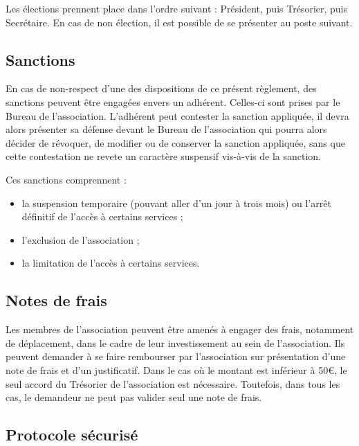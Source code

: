 \documentclass[12pt, a4paper]{article}
\begin{document}
	\bigskip

	Les élections prennent place dans l'ordre suivant : Président, puis Trésorier,
	puis Secrétaire. En cas de non élection, il est possible de se présenter au
	poste suivant.

	\subsection{Sanctions}

	En cas de non-respect d'une des dispositions de ce présent règlement, des
	sanctions peuvent être engagées envers un adhérent. Celles-ci sont prises par le
	Bureau de l'association. L'adhérent peut contester la sanction appliquée, il devra
	alors présenter sa défense devant le Bureau de l'association qui pourra alors décider
	de révoquer, de modifier ou de conserver la sanction appliquée, sans que cette
	contestation ne revete un caractère suspensif vis-à-vis de la sanction.

	\bigskip

	Ces sanctions comprennent :

	\bigskip

	\begin{itemize}
		\item[\textbullet] la suspension temporaire (pouvant aller d'un jour à trois
			mois) ou l'arrêt définitif de l'accès à certains services ;

		\item[\textbullet] l'exclusion de l'association ;

		\item[\textbullet] la limitation de l'accès à certains services.
	\end{itemize}

	\subsection{Notes de frais}

	Les membres de l'association peuvent être amenés à engager des frais,
	notamment de déplacement, dans le cadre de leur investissement au sein de l'association.
	Ils peuvent demander à se faire rembourser par l'association sur présentation d'une
	note de frais et d'un justificatif. Dans le cas où le montant est inférieur à
	50€, le seul accord du Trésorier de l'association est nécessaire. Toutefois,
	dans tous les cas, le demandeur ne peut pas valider seul une note de frais.

	\subsection{Protocole sécurisé}
\end{document}
